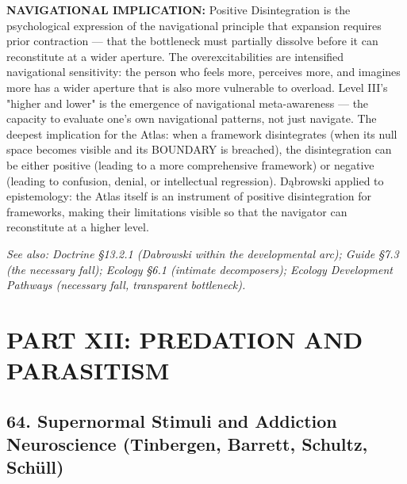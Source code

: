 \textbf{NAVIGATIONAL IMPLICATION:} Positive Disintegration is the psychological expression of the navigational principle that expansion requires prior contraction — that the bottleneck must partially dissolve before it can reconstitute at a wider aperture. The overexcitabilities are intensified navigational sensitivity: the person who feels more, perceives more, and imagines more has a wider aperture that is also more vulnerable to overload. Level III's "higher and lower" is the emergence of navigational meta-awareness — the capacity to evaluate one's own navigational patterns, not just navigate. The deepest implication for the Atlas: when a framework disintegrates (when its null space becomes visible and its BOUNDARY is breached), the disintegration can be either positive (leading to a more comprehensive framework) or negative (leading to confusion, denial, or intellectual regression). Dąbrowski applied to epistemology: the Atlas itself is an instrument of positive disintegration for frameworks, making their limitations visible so that the navigator can reconstitute at a higher level.


\textit{See also: Doctrine §13.2.1 (Dabrowski within the developmental arc); Guide §7.3 (the necessary fall); Ecology §6.1 (intimate decomposers); Ecology Development Pathways (necessary fall, transparent bottleneck).}


\bigskip\noindent\makebox[\textwidth]{\color{rulegray}\rule{5cm}{0.3pt}}\bigskip


\chapter*{PART XII: PREDATION AND PARASITISM}


\section*{64. Supernormal Stimuli and Addiction Neuroscience (Tinbergen, Barrett, Schultz, Schüll)}


